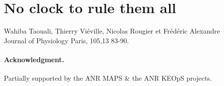
\section{No clock to rule them all}
\begin{center}
Wahiba Taouali, Thierry Vi\'eville, Nicolas Rougier et Fr\'ed\'eric Alexandre\\
Journal of Physiology Paris, 105,13  83-90.
\end{center}










\paragraph{Acknowledgment.} Partially supported by the ANR MAPS \& the ANR KEOpS projects.

